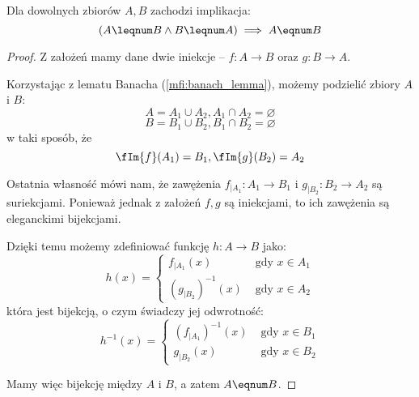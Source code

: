\begin{theorem}
Dla dowolnych zbiorów \( A, B \) zachodzi implikacja:
    \[
        (A \leqnum B \land B \leqnum A) \implies A \eqnum B
    \]
\end{theorem}
\begin{proof}
    Z założeń mamy dane dwie iniekcje -- \( f: A \rightarrow B \) oraz \( g: B \rightarrow A \).
    
    Korzystając z lematu Banacha (\ref{mfi:banach_lemma}), możemy podzielić zbiory \(A\) i \(B\):
    \[
        A = A_1 \cup A_2, A_1 \cap A_2 = \varnothing
    \]
    \[
        B = B_1 \cup B_2, B_1 \cap B_2 = \varnothing
    \]
    w taki sposób, że 
    \[
        \fIm{f}(A_1) = B_1, \fIm{g}(B_2) = A_2
    \]
    
    Ostatnia własność mówi nam, że zawężenia \( f_{\mid A_1} : A_1 \rightarrow B_1 \) i  \( g_{\mid B_2} : B_2 \rightarrow A_2 \) są suriekcjami.
    Ponieważ jednak z założeń \( f, g \) są iniekcjami, to ich zawężenia są eleganckimi bijekcjami.
    
    Dzięki temu możemy zdefiniować funkcję \( h: A \rightarrow B \) jako:
    \[
        h(x) = \begin{cases}
        f_{\mid A_1}(x) & \text{ gdy } x \in A_1 \\
        (g_{\mid B_2})^{-1}(x) & \text{ gdy } x \in A_2
        \end{cases}
    \]
    która jest bijekcją, o czym świadczy jej odwrotność:
    \[
        h^{-1}(x) = \begin{cases}
        (f_{\mid A_1})^{-1}(x) & \text{ gdy } x \in B_1 \\
        g_{\mid B_2}(x) & \text{ gdy } x \in B_2
        \end{cases}
    \]
    
    Mamy więc bijekcję między \( A \) i \( B \), a zatem \( A \eqnum B \).
    
    
\end{proof}
